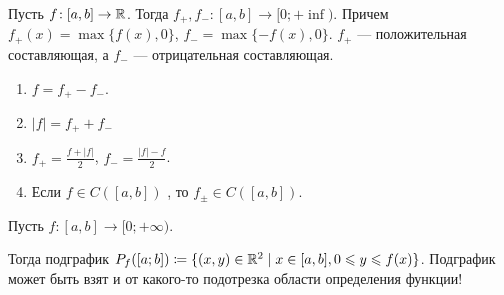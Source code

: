 \begin{definition}
    Пусть $f\!: [a, b] \to \mathbb{R}$. Тогда  $f_+, f_-\!: [a, b] \to [0; +\inf)$. Причем  $f_+(x) = \max\{f(x), 0\}$,  $f_- = \max\{-f(x), 0\}$. $f_+$ --- положительная составляющая, а $f_-$ --- отрицательная составляющая.
\end{definition}
\begin{properties}
    \begin{enumerate}
        \item $f = f_+ - f_-$.
        \item  $|f| = f_+ + f_-$
        \item  $f_+ = \frac{f + |f|}{2}$, $f_- = \frac{|f| - f}{2}$.
        \item Если $f \in C([a, b])$ , то  $f_{\pm} \in C([a, b])$.
    \end{enumerate}
\end{properties}

\begin{definition}
	Пусть $f\!: [a, b] \to [0; +\infty)$.

    Тогда подграфик $P_f([a; b]) \coloneqq \{(x, y) \in \mathbb{R}^2 \mid x \in [a, b], 0 \leqslant y \leqslant f(x)\}$.
    Подграфик может быть взят и от какого-то подотрезка области определения функции!
\end{definition}
